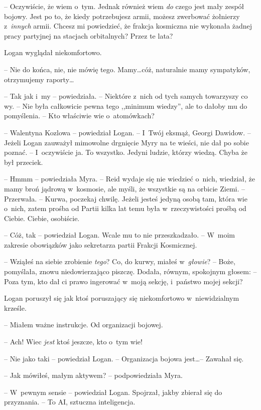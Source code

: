 \documentclass[oneside,polish,11pt,sfheadings]{mwbk}
\begin{document}
-- Oczywiście, że wiem o~tym. Jednak również wiem \textit{do} czego jest
mały zespół bojowy. Jest po to, że kiedy potrzebujesz armii, możesz
zwerbować żołnierzy z~\textit{innych} armii. Chcesz mi powiedzieć, że
frakcja kosmiczna nie wykonała żadnej pracy partyjnej na stacjach
orbitalnych? Przez te lata?

Logan wyglądał niekomfortowo. 

-- Nie do końca, nie, nie mówię tego.
Mamy\ldots cóż, naturalnie mamy sympatyków, otrzymujemy raporty\ldots

-- Tak jak i~my -- powiedziała. -- Niektóre z~nich od tych samych
towarzyszy co wy. -- Nie była całkowicie pewna tego ,,minimum wiedzy'',
ale to dałoby mu do pomyślenia. -- Kto właściwie wie o~atomówkach?

-- Walentyna Kozlowa -- powiedział Logan. -- I~Twój eksmąż, Georgi Dawidow.
-- Jeżeli Logan zauważył mimowolne drgnięcie Myry na te wieści, nie dał
po sobie poznać. -- I~oczywiście ja. To wszystko. Jedyni ludzie, którzy
wiedzą. Chyba że był przeciek.

-- Hmmm -- powiedziała Myra. -- Reid wydaje się nie wiedzieć o~nich,
wiedział, że mamy broń jądrową w~kosmosie, ale myśli, że wszystkie są na
orbicie Ziemi. -- Przerwała. -- Kurwa, poczekaj chwilę. Jeżeli jesteś
jedyną osobą tam, która wie o~nich, zatem prośba od Partii kilka lat
temu była w~rzeczywistości prośbą od Ciebie. Ciebie, osobiście.

-- Cóż, tak -- powiedział Logan. Wcale mu to nie przeszkadzało. -- W~moim
zakresie obowiązków jako sekretarza partii Frakcji Kosmicznej.

-- Wziąłeś na siebie zrobienie \textit{tego}? Co, do kurwy, miałeś w~\textit{głowie}? -- Boże, pomyślała, znowu niedowierzająco piszczę. Dodała,
równym, spokojnym głosem: -- Poza tym, kto dał ci prawo ingerować w~moją
sekcję, i~państwo mojej sekcji?

Logan poruszył się jak ktoś poruszający się niekomfortowo w~niewidzialnym krześle. 

-- Miałem ważne instrukcje. Od organizacji
bojowej.

-- Ach! Wiec \textit{jest} ktoś jeszcze, kto o~tym wie!

-- Nie jako taki -- powiedział Logan. -- Organizacja bojowa jest\ldots -- Zawahał się.

-- Jak mówiłeś, małym aktywem? -- podpowiedziała Myra.

-- W~pewnym sensie -- powiedział Logan. Spojrzał, jakby zbierał się do
przyznania. -- To AI, sztuczna inteligencja.
\end{document}
